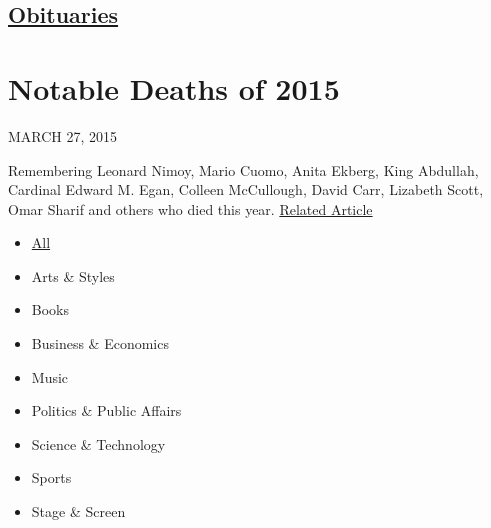 \hypertarget{-obituaries-}{%
\subsection{\texorpdfstring{
\href{https://www.nytimes.com/section/obituaries}{Obituaries}
}{ Obituaries }}\label{-obituaries-}}

\hypertarget{notable-deaths-of-2015}{%
\section{Notable Deaths of 2015}\label{notable-deaths-of-2015}}

MARCH 27, 2015

Remembering Leonard Nimoy, Mario Cuomo, Anita Ekberg, King Abdullah,
Cardinal Edward M. Egan, Colleen McCullough, David Carr, Lizabeth Scott,
Omar Sharif and others who died this year.
\href{https://www.nytimes.com/interactive/2014/obituaries/notable-deaths-2014.html}{Related
Article}

\begin{itemize}
\tightlist
\item
  \href{/}{All}
\end{itemize}

\begin{itemize}
\tightlist
\item
  Arts \& Styles
\item
  Books
\item
  Business \& Economics
\item
  Music
\item
  Politics \& Public Affairs
\item
  Science \& Technology
\item
  Sports
\item
  Stage \& Screen
\end{itemize}

\subsection{}

